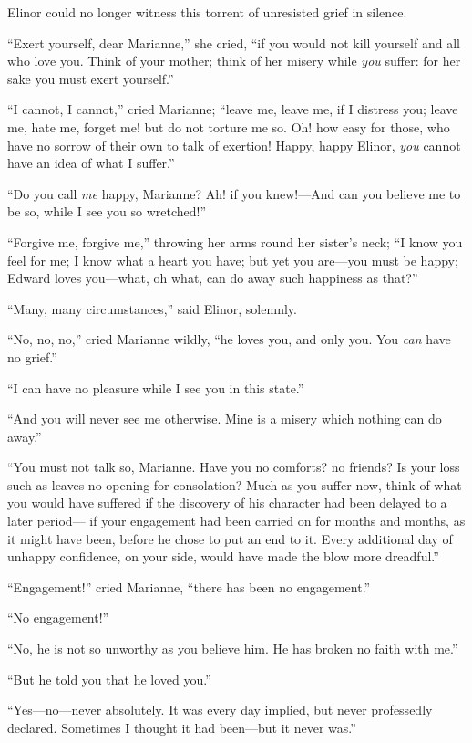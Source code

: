 Elinor could no longer witness this torrent
of unresisted grief in silence.

``Exert yourself, dear Marianne,'' she cried,
``if you would not kill yourself and all who love you.
Think of your mother; think of her misery while \emph{you} suffer:
for her sake you must exert yourself.''

``I cannot, I cannot,'' cried Marianne; ``leave me,
leave me, if I distress you; leave me, hate me, forget me!
but do not torture me so.  Oh! how easy for those,
who have no sorrow of their own to talk of exertion!  Happy,
happy Elinor, \emph{you} cannot have an idea of what I suffer.''

``Do you call \emph{me} happy, Marianne?  Ah! if you knew!---And
can you believe me to be so, while I see you so wretched!''

``Forgive me, forgive me,'' throwing her arms round
her sister's neck; ``I know you feel for me; I know what
a heart you have; but yet you are---you must be happy;
Edward loves you---what, oh what, can do away such happiness
as that?''

``Many, many circumstances,'' said Elinor, solemnly.

``No, no, no,'' cried Marianne wildly, ``he loves you,
and only you.  You \emph{can} have no grief.''

``I can have no pleasure while I see you in this state.''

``And you will never see me otherwise.  Mine is
a misery which nothing can do away.''

``You must not talk so, Marianne.  Have you no
comforts? no friends?  Is your loss such as leaves
no opening for consolation?  Much as you suffer now,
think of what you would have suffered if the discovery
of his character had been delayed to a later period---%
if your engagement had been carried on for months and months,
as it might have been, before he chose to put an end to it.
Every additional day of unhappy confidence, on your side,
would have made the blow more dreadful.''

``Engagement!'' cried Marianne, ``there has been
no engagement.''

``No engagement!''

``No, he is not so unworthy as you believe him.
He has broken no faith with me.''

``But he told you that he loved you.''

``Yes---no---never absolutely.  It was every day implied,
but never professedly declared.  Sometimes I thought it
had been---but it never was.''

